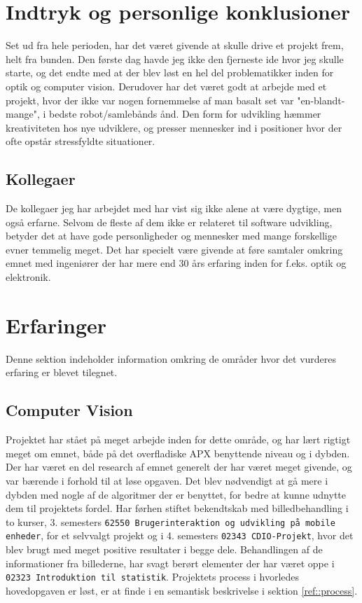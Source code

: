 \section{Indtryk og personlige konklusioner}

Set ud fra hele perioden, har det været givende at skulle drive et projekt frem, helt fra bunden. Den første dag havde jeg ikke den fjerneste ide hvor jeg skulle starte, og det endte med at der blev løst en hel del problematikker inden for optik og computer vision.
Derudover har det været godt at arbejde med et projekt, hvor der ikke var nogen fornemmelse af man basalt set var "en-blandt-mange", i bedste robot/samlebånds ånd. Den form for udvikling hæmmer kreativiteten hos nye udviklere, og presser mennesker ind i positioner hvor der ofte opstår stressfyldte situationer.

\subsection{Kollegaer}
De kollegaer jeg har arbejdet med har vist sig ikke alene at være dygtige, men også erfarne. Selvom de fleste af dem ikke er relateret til software udvikling, betyder det at have gode personligheder og mennesker med mange forskellige evner temmelig meget. Det har specielt være givende at føre samtaler omkring emnet med ingeniører der har mere end 30 års erfaring inden for f.eks. optik og elektronik.

\section{Erfaringer}
Denne sektion indeholder information omkring de områder hvor det vurderes erfaring er blevet tilegnet.

\subsection{Computer Vision}
Projektet har stået på meget arbejde inden for dette område, og har lært rigtigt meget om emnet, både på det overfladiske APX benyttende niveau og i dybden. Der har været en del research af emnet generelt der har været meget givende, og var bærende i forhold til at løse opgaven.
Det blev nødvendigt at gå mere i dybden med nogle af de algoritmer der er benyttet, for bedre at kunne udnytte dem til projektets fordel.
Har førhen stiftet bekendtskab med billedbehandling i to kurser, 3. semesters \texttt{62550 Brugerinteraktion og udvikling på mobile enheder}, for et selvvalgt projekt og i 4. semesters \texttt{02343 CDIO-Projekt}, hvor det blev brugt med meget positive resultater i begge dele.
Behandlingen af de informationer fra billederne, har svagt berørt elementer der har været oppe i \texttt{02323 Introduktion til statistik}.
Projektets process i hvorledes hovedopgaven er løst, er at finde i en semantisk beskrivelse i sektion \ref{ref::process}.

